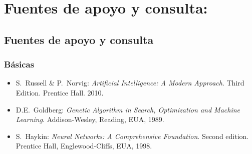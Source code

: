 \section{Fuentes de apoyo y consulta:}
\subsection{Fuentes de apoyo y consulta}
\subsubsection{B\'{a}sicas}

\begin{itemize}[itemsep=0em]
  
\item{S.\ {\sc Russell} \& P.\ {\sc Norvig}: {\em Artificial
    Intelligence: A Modern Approach}. Third Edition. Prentice
  Hall. 2010.}

\item{D.E.\ {\sc Goldberg}: {\em Genetic Algorithm in Search,
    Optimization and Machine Learning}. Addison-Wesley, Reading, EUA,
  1989.}

\item{S.\ {\sc Haykin}: {\em Neural Networks: A Comprehensive
    Foundation}. Second edition. Prentice Hall, Englewood-Cliffs, EUA,
  1998.}

\end{itemize}


